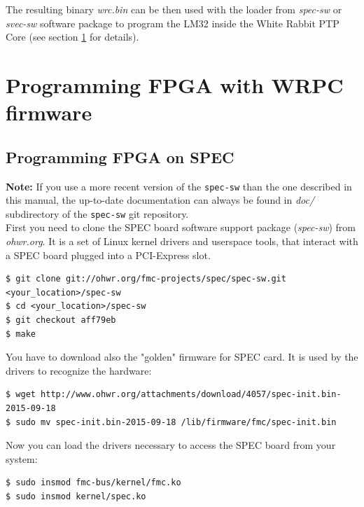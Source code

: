 \documentclass[a4paper, 12pt]{article}
\begin{document}
The resulting binary \textit{wrc.bin} can be then used with the loader from
\textit{spec-sw} or \textit{svec-sw} software package to program the LM32 inside
the White Rabbit PTP Core (see section \ref{Programming FPGA} for details).

\section{Programming FPGA with WRPC firmware}
\label{Programming FPGA}

\subsection{Programming FPGA on SPEC}
\label{Programming FPGA on SPEC}

\textbf{Note:} If you use a more recent version of the \texttt{spec-sw} than the
one described in this manual, the up-to-date documentation can always be found
in \textit{doc/} subdirectory of the \texttt{spec-sw} git repository.\\

First you need to clone the SPEC board software support package
(\textit{spec-sw}) from \textit{ohwr.org}. It is a set of Linux kernel drivers and
userspace tools, that interact with a SPEC board plugged into a PCI-Express
slot.\\

\begin{lstlisting}
$ git clone git://ohwr.org/fmc-projects/spec/spec-sw.git <your_location>/spec-sw
$ cd <your_location>/spec-sw
$ git checkout aff79eb
$ make
\end{lstlisting}

You have to download also the "golden" firmware for SPEC card. It is used by
the drivers to recognize the hardware:
\begin{lstlisting}
$ wget http://www.ohwr.org/attachments/download/4057/spec-init.bin-2015-09-18
$ sudo mv spec-init.bin-2015-09-18 /lib/firmware/fmc/spec-init.bin
\end{lstlisting}

Now you can load the drivers necessary to access the SPEC board from your
system:
\begin{lstlisting}
$ sudo insmod fmc-bus/kernel/fmc.ko
$ sudo insmod kernel/spec.ko
\end{lstlisting}
\end{document}

